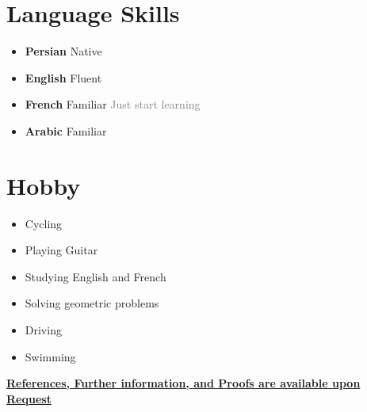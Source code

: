 \documentclass[10pt,a4paper,sans]{moderncv} %
\begin{document}
\section{Language Skills}

\begin{itemize}
\item \textbf{Persian} \hspace{5 pt} Native
\item \textbf{English} \hspace{6 pt} Fluent   
\item \textbf{French} \hspace{6 pt} Familiar   \textcolor{gray}{Just start learning}
\item \textbf{Arabic} \hspace{10 pt} Familiar \\
\end{itemize} 

\section{Hobby}
\begin{itemize}
\item Cycling
\item Playing Guitar
\item Studying English and French
\item Solving geometric problems
\item Driving 
\item Swimming
\end{itemize}



\centerline{\underline{\textbf{\faExclamationSign \hspace{0.5 pt} References, Further information, and Proofs are available upon Request}}}
\end{document}
